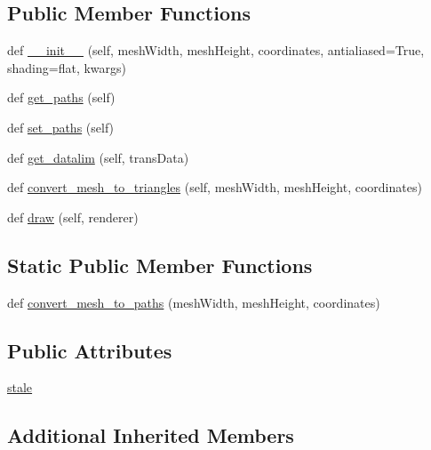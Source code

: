 \subsection*{Public Member Functions}
\begin{DoxyCompactItemize}
\item 
def \hyperlink{classmatplotlib_1_1collections_1_1QuadMesh_af624268ac4797e8905f15b343fbadf84}{\+\_\+\+\_\+init\+\_\+\+\_\+} (self, mesh\+Width, mesh\+Height, coordinates, antialiased=True, shading=\textquotesingle{}flat\textquotesingle{}, kwargs)
\item 
def \hyperlink{classmatplotlib_1_1collections_1_1QuadMesh_afa6518b350893529ca39545ddacbbdf2}{get\+\_\+paths} (self)
\item 
def \hyperlink{classmatplotlib_1_1collections_1_1QuadMesh_af6dd36dcd66289485f69a4833912e45d}{set\+\_\+paths} (self)
\item 
def \hyperlink{classmatplotlib_1_1collections_1_1QuadMesh_ae6fb69992d2e23a7c07429172b3f1f90}{get\+\_\+datalim} (self, trans\+Data)
\item 
def \hyperlink{classmatplotlib_1_1collections_1_1QuadMesh_a1d06579b71cff52449727d09e8f7e1d6}{convert\+\_\+mesh\+\_\+to\+\_\+triangles} (self, mesh\+Width, mesh\+Height, coordinates)
\item 
def \hyperlink{classmatplotlib_1_1collections_1_1QuadMesh_a6b7f7f745969d0306fe8cc4f356f566e}{draw} (self, renderer)
\end{DoxyCompactItemize}
\subsection*{Static Public Member Functions}
\begin{DoxyCompactItemize}
\item 
def \hyperlink{classmatplotlib_1_1collections_1_1QuadMesh_a1c6682558e4b0c0711c3201b1d0338a9}{convert\+\_\+mesh\+\_\+to\+\_\+paths} (mesh\+Width, mesh\+Height, coordinates)
\end{DoxyCompactItemize}
\subsection*{Public Attributes}
\begin{DoxyCompactItemize}
\item 
\hyperlink{classmatplotlib_1_1collections_1_1QuadMesh_aeaa9b40936df1d30561e881bb0ac736e}{stale}
\end{DoxyCompactItemize}
\subsection*{Additional Inherited Members}


